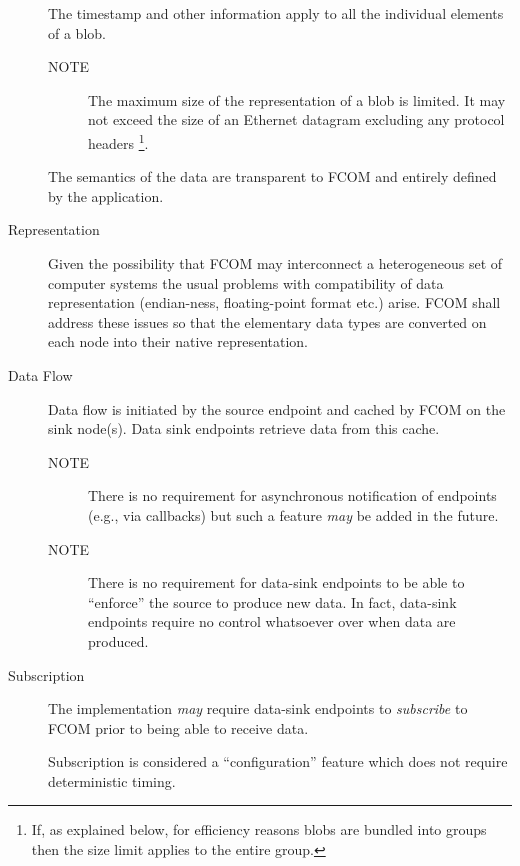 \documentclass[11pt]{article}
\newcommand{\fcom}{FCOM}
\newcommand{\blob}{blob}
\newcommand{\group}{group}
\newcommand{\note}[1]{
	\begin{description}
		\item[NOTE] #1
	\end{description}
}
\begin{document}
\begin{description}
					The timestamp and other information apply to all
                    the individual elements of a \blob{}.

                    \note{The maximum size of the representation of a \blob{}
                    is limited. It may not exceed the size of an Ethernet
                    datagram excluding any protocol headers%
\footnote{If, as explained below, for efficiency reasons \blob{}s are
bundled into \group{}s then the size limit applies to the entire \group{}.}.}

                    The semantics of the data are transparent
                    to \fcom{} and entirely defined by the application.

\item[Representation] Given the possibility that \fcom{} may interconnect
                    a heterogeneous set of computer systems the
                    usual problems with compatibility of data
                    representation (endian-ness, floating-point format etc.) 
                    arise. \fcom{} shall address these issues so that
                    the elementary data types are converted on each
                    node into their native representation.

\item[Data Flow]    Data flow is initiated by the source endpoint and
                    cached by \fcom{} on the sink node(s). Data sink 
                    endpoints retrieve data from this cache.

                    \note{There is no requirement for asynchronous
                    notification of endpoints (e.g., via callbacks)
                    but such a feature {\em may} be added in the future.}

					\note{There is no requirement for data-sink
                    endpoints to be able to ``enforce'' the source
                    to produce new data. In fact, data-sink endpoints
                    require no control whatsoever over when data
                    are produced.}

\item[Subscription]
                    The implementation {\em may} require data-sink
                    endpoints to {\em subscribe} to \fcom{} prior
                    to being able to receive data.

                    Subscription is considered a ``configuration''
                    feature which does not require deterministic
                    timing.


\end{description}
\end{document}
